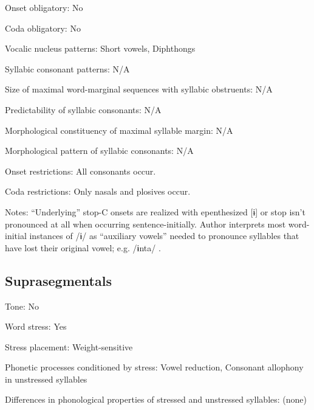 {\begin{appendixdesc}
\item[Onset obligatory:] No

\item[Coda obligatory:] No

\item[Vocalic nucleus patterns:] Short vowels, Diphthongs

\item[Syllabic consonant patterns:] N/A

\item[Size of maximal word-marginal sequences with syllabic obstruents:] N/A

\item[Predictability of syllabic consonants:] N/A

\item[Morphological constituency of maximal syllable margin:] N/A

\item[Morphological pattern of syllabic consonants:] N/A

\item[Onset restrictions:] All consonants occur.

\item[Coda restrictions:] Only nasals and plosives occur.

\item[Notes:] “Underlying” stop-C onsets are realized with epenthesized [ɨ] or stop isn’t pronounced at all when occurring sentence-initially. Author interprets most word-initial instances of /ɨ/ as “auxiliary vowels” needed to pronounce syllables that have lost their original vowel; e.g. /ɨnta/ \citep[26]{Courtz2008}.
\end{appendixdesc}
\subsection*{Suprasegmentals}
\begin{appendixdesc}
\item[Tone:] No

\item[Word stress:] Yes

\item[Stress placement:] Weight-sensitive

\item[Phonetic processes conditioned by stress:] Vowel reduction, Consonant allophony in unstressed syllables

\item[Differences in phonological properties of stressed and unstressed syllables:] (none)


\end{appendixdesc}}
